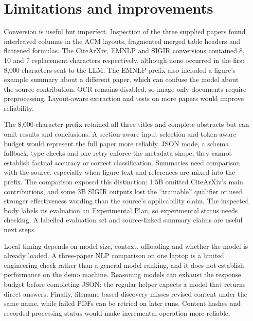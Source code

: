 \section{Limitations and improvements}
\label{sec:limitations}

Conversion is useful but imperfect. Inspection of the three supplied papers
found interleaved columns in the ACM layouts, fragmented merged table
headers and flattened formulas. The CiteArXiv, EMNLP and SIGIR conversions
contained 8, 10 and 7 replacement characters respectively, although none
occurred in the first 8,000 characters sent to the LLM. The EMNLP prefix
also included a figure's example summary about a different paper, which can
confuse the model about the source contribution. OCR remains disabled, so
image-only documents require preprocessing. Layout-aware extraction and
tests on more papers would improve reliability.

The 8,000-character prefix retained all three titles and complete abstracts
but can omit results and conclusions. A section-aware input selection and
token-aware budget would represent the full paper more reliably. JSON mode,
a schema fallback, type checks and one retry enforce the metadata shape;
they cannot establish factual accuracy or correct classification. Summaries
need comparison with the source, especially when figure text and references
are mixed into the prefix. The comparison exposed this distinction: 1.5B
omitted CiteArXiv's main contributions, and some 3B SIGIR outputs lost the
``trainable'' qualifier or used stronger effectiveness wording than the
source's applicability claim. The inspected body labels its evaluation an
Experimental Plan, so experimental status needs checking. A labelled
evaluation set and source-linked summary claims are useful next steps.

Local timing depends on model size, context, offloading and whether the
model is already loaded. A three-paper NLP comparison on one laptop is a
limited engineering check rather than a general model ranking, and it does
not establish performance on the demo machine. Reasoning models can exhaust
the response budget before completing JSON; the regular helper expects a
model that returns direct answers. Finally, filename-based discovery misses
revised content under the same name, while failed PDFs can be retried on
later runs. Content hashes and recorded processing status would make
incremental operation more reliable.
